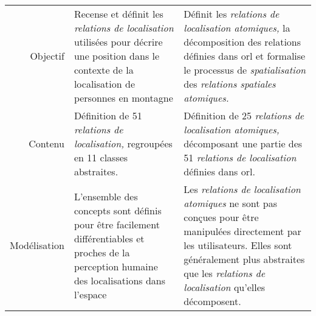 \begin{tabular}{r>{\small}p{}>{\small}p{}}
  \toprule & \multicolumn{1}{c}{\ac{orl}} &
  \multicolumn{1}{c}{\ac{orla}} \\ \midrule
  \addlinespace
  Objectif & Recense et définit les \emph{relations de localisation} utilisées
  pour décrire une position dans le contexte de la localisation de
  personnes en montagne & Définit les \emph{relations de localisation
                          atomiques,} la décomposition des relations
  définies dans \ac{orl} et formalise le processus de
                          \emph{spatialisation} des \emph{relations
                          spatiales atomiques.}\\
  Contenu & Définition de 51 \emph{relations de localisation,}
            regroupées en 11 classes abstraites. & Définition de 25
                                                   \emph{relations de
                                                   localisation
                                                   atomiques,}
                                                   décomposant une partie des
                                                   51 \emph{relations
                                                   de localisation}
                                                   définies dans \ac{orl}.\\
  Modélisation & L'ensemble des concepts sont définis pour être facilement
                 différentiables et proches de la perception humaine des
                 localisations dans l'espace & Les \emph{relations de
                                               localisation atomiques} ne sont
                                               pas conçues pour être manipulées
                                               directement par les utilisateurs.
                                               Elles sont généralement plus abstraites que les \emph{relations de
                                               localisation} qu'elles
                                               décomposent.\\ 
  \bottomrule
\end{tabular}
